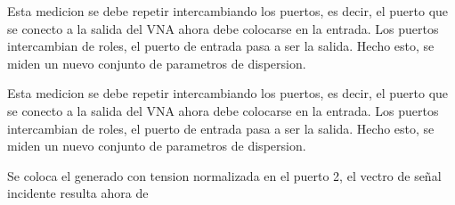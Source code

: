\documentclass{article}
\begin{document}
\begin{Maple Normal}{
\begin{Maple Normal}{
Esta medicion se debe repetir intercambiando los puertos, es decir, el puerto que se conecto a la salida del VNA ahora debe colocarse en la entrada. Los puertos intercambian de roles, el puerto de entrada pasa a ser la salida. Hecho esto, se miden un nuevo conjunto de parametros de dispersion.}\end{Maple Normal}

\begin{Maple Normal}{
Esta medicion se debe repetir intercambiando los puertos, es decir, el puerto que se conecto a la salida del VNA ahora debe colocarse en la entrada. Los puertos intercambian de roles, el puerto de entrada pasa a ser la salida. Hecho esto, se miden un nuevo conjunto de parametros de dispersion.}\end{Maple Normal}

}\end{Maple Normal}

\begin{Maple Normal}{
\begin{Maple Normal}{
}\end{Maple Normal}
}\end{Maple Normal}
\begin{Maple Normal}{
\begin{Maple Normal}{
Se coloca el generado con tension normalizada en el puerto 2, el vectro de señal incidente resulta ahora de}\end{Maple Normal}

}\end{Maple Normal}
\end{document}
